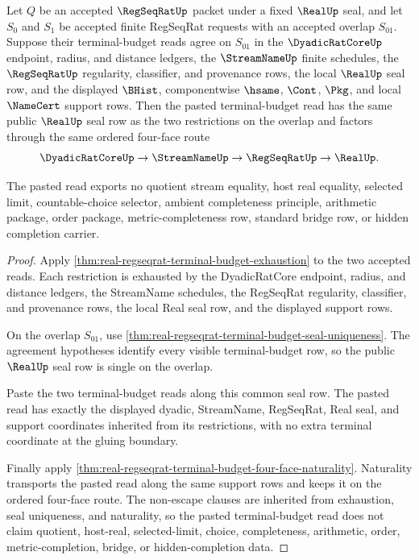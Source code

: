 \begin{theorem}
\label{thm:real-terminal-budget-pasting-exactness}
Let $Q$ be an accepted $\RegSeqRatUp$ packet under a fixed $\RealUp$ seal, and
let $S_0$ and $S_1$ be accepted finite RegSeqRat requests with an accepted
overlap $S_{01}$. Suppose their terminal-budget reads agree on $S_{01}$ in the
$\DyadicRatCoreUp$ endpoint, radius, and distance ledgers, the $\StreamNameUp$
finite schedules, the $\RegSeqRatUp$ regularity, classifier, and provenance
rows, the local $\RealUp$ seal row, and the displayed $\BHist$,
componentwise $\hsame$, $\Cont$, $\Pkg$, and local $\NameCert$ support rows.
Then the pasted terminal-budget read has the same public $\RealUp$ seal row as
the two restrictions on the overlap and factors through the same ordered
four-face route
$$
\DyadicRatCoreUp \to \StreamNameUp \to \RegSeqRatUp \to \RealUp .
$$

The pasted read exports no quotient stream equality, host real equality,
selected limit, countable-choice selector, ambient completeness principle,
arithmetic package, order package, metric-completeness row, standard bridge
row, or hidden completion carrier.
\end{theorem}
\begin{proof}
Apply \autoref{thm:real-regseqrat-terminal-budget-exhaustion} to the two
accepted reads. Each restriction is exhausted by the DyadicRatCore endpoint,
radius, and distance ledgers, the StreamName schedules, the RegSeqRat
regularity, classifier, and provenance rows, the local Real seal row, and the
displayed support rows.

On the overlap $S_{01}$, use
\autoref{thm:real-regseqrat-terminal-budget-seal-uniqueness}. The agreement
hypotheses identify every visible terminal-budget row, so the public
$\RealUp$ seal row is single on the overlap.

Paste the two terminal-budget reads along this common seal row. The pasted
read has exactly the displayed dyadic, StreamName, RegSeqRat, Real seal, and
support coordinates inherited from its restrictions, with no extra terminal
coordinate at the gluing boundary.

Finally apply
\autoref{thm:real-regseqrat-terminal-budget-four-face-naturality}. Naturality
transports the pasted read along the same support rows and keeps it on the
ordered four-face route. The non-escape clauses are inherited from exhaustion,
seal uniqueness, and naturality, so the pasted terminal-budget read does not
claim quotient, host-real, selected-limit, choice, completeness, arithmetic,
order, metric-completion, bridge, or hidden-completion data.
\end{proof}

